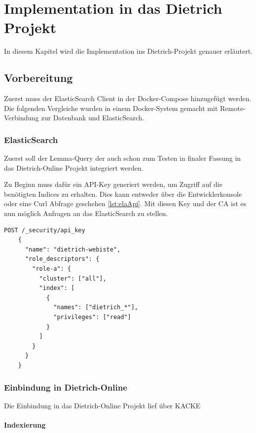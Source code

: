 \chapter{Implementation in das Dietrich Projekt}

In diesem Kapitel wird die Implementation ins Dietrich-Projekt genauer erläutert.

\section{Vorbereitung}

Zuerst muss der ElasticSearch Client in der Docker-Compose hinzugefügt werden. Die folgenden Vergleiche wurden in einem Docker-System gemacht mit Remote-Verbindung zur Datenbank und ElasticSearch. 

\subsection{ElasticSearch}

Zuerst soll der Lemma-Query der auch schon zum Testen in finaler Fassung in das Dietrich-Online Projekt integriert werden.

Zu Beginn muss dafür ein API-Key generiert werden, um Zugriff auf die benötigten Indices zu erhalten. Dies kann entweder über die Entwicklerkonsole oder eine Curl Abfrage geschehen \ref{lst:elaApi}. Mit diesen Key und der CA ist es nun möglich Anfragen an das ElasticSearch zu stellen.

\begin{lstlisting}[language=XML, frame=single, label={lst:elaApi}] 
    POST /_security/api_key
    {
      "name": "dietrich-webiste",
      "role_descriptors": { 
        "role-a": {
          "cluster": ["all"],
          "index": [
            {
              "names": ["dietrich_*"],
              "privileges": ["read"]
            }
          ]
        }
      }
    }
\end{lstlisting}


\subsection{Einbindung in Dietrich-Online}

Die Einbindung in das Dietrich-Online Projekt lief über KACKE

\subsubsection{Indexierung}

